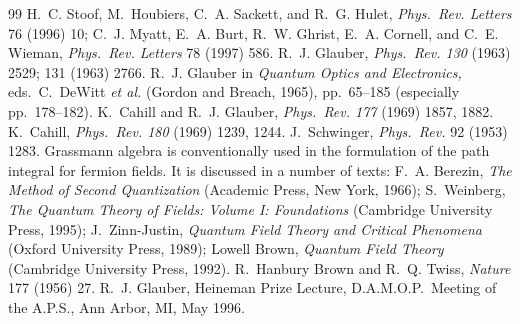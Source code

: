 \documentclass[12pt]{article}
\begin{document}
\begin{thebibliography}{99}
 H.~C. Stoof, M.~Houbiers, C.~A. Sackett,
and R.~G. Hulet, {\sl Phys.~Rev. Letters\/} 76 (1996) 10;
C.~J. Myatt, E.~A. Burt, R.~W. Ghrist, E.~A. Cornell, and
C.~E. Wieman, {\sl Phys.~Rev. Letters\/} 78 (1997) 586.
 R.~J. Glauber, {\sl Phys.~Rev.\/ \rm 130} (1963) 2529; 
131 (1963) 2766.
 R.~J. Glauber in
{\sl Quantum Optics and Electronics,}
eds.~C.~DeWitt {\sl et al.} (Gordon and Breach, 1965),
pp.~65--185 (especially pp.~178--182).
 K.~Cahill and R.~J. Glauber,
{\sl Phys.~Rev.\/ \rm 177} (1969) 1857, 1882. 
 K.~Cahill, {\sl Phys.~Rev.\/ \rm 180}
(1969) 1239, 1244. 
 J.~Schwinger, {\sl  Phys.~Rev.\/} 92 (1953) 1283.
 Grassmann algebra is conventionally used
in the formulation of the path integral for fermion fields.
It is discussed in a number of texts:
F.~A. Berezin, {\sl The Method
of Second Quantization\/}
(Academic Press, New York, 1966);
S.~Weinberg, {\sl The Quantum Theory of Fields:
Volume I: Foundations\/} (Cambridge University Press, 1995);
J.~Zinn-Justin, {\sl Quantum Field Theory
and Critical Phenomena\/} (Oxford University Press, 1989);
Lowell Brown, {\sl Quantum Field Theory\/}
(Cambridge University Press, 1992).
 R.~Hanbury Brown and R.~Q. Twiss,
{\sl Nature\/} 177 (1956) 27.
 R.~J. Glauber, Heineman Prize Lecture,
D.A.M.O.P.~Meeting of the A.P.S., 
Ann Arbor, MI, May 1996.
\end{thebibliography}
\end{document}
